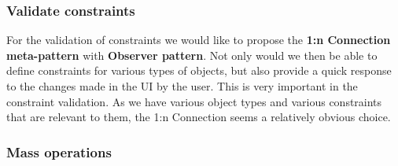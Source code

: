 \subsubsection{Validate constraints}
For the validation of constraints we would like to propose the \textbf{1:n Connection meta-pattern} with \textbf{Observer pattern}. Not only would we then be able to define constraints for various types of objects, but also provide a quick response to the changes made in the UI by the user. This is very important in the constraint validation. As we have various object types and various constraints that are relevant to them, the 1:n Connection seems a relatively obvious choice.

\subsubsection{Mass operations}

